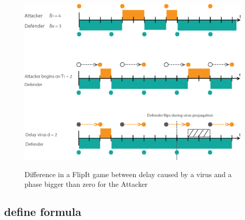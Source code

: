 
\begin{figure}[hbtp]
\caption{Difference in a FlipIt game between delay caused by a virus and a phase bigger than zero for the Attacker}
\centering
\includegraphics[scale=1]{Images/Flipvirus}
\label{fig:virusflip}
\end{figure}


\subsection{define formula}





